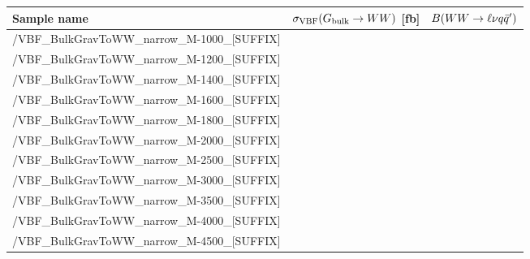 \footnotesize
\begin{tabular}{lrr}
  \hline
  \textbf{Sample name} & $\sigma_{\mathrm{VBF}}(G_\mathrm{bulk}\to WW)$ [fb] & $B(WW\to\ell\nu q\bar{q}')$ \\
  \hline
  \ttfamily/VBF\_BulkGravToWW\_narrow\_M-1000\_[SUFFIX] &   \\
  \ttfamily/VBF\_BulkGravToWW\_narrow\_M-1200\_[SUFFIX] &   \\
  \ttfamily/VBF\_BulkGravToWW\_narrow\_M-1400\_[SUFFIX] &   \\
  \ttfamily/VBF\_BulkGravToWW\_narrow\_M-1600\_[SUFFIX] &   \\
  \ttfamily/VBF\_BulkGravToWW\_narrow\_M-1800\_[SUFFIX] &   \\
  \ttfamily/VBF\_BulkGravToWW\_narrow\_M-2000\_[SUFFIX] &   \\
  \ttfamily/VBF\_BulkGravToWW\_narrow\_M-2500\_[SUFFIX] &   \\
  \ttfamily/VBF\_BulkGravToWW\_narrow\_M-3000\_[SUFFIX] &   \\
  \ttfamily/VBF\_BulkGravToWW\_narrow\_M-3500\_[SUFFIX] &   \\
  \ttfamily/VBF\_BulkGravToWW\_narrow\_M-4000\_[SUFFIX] &   \\
  \ttfamily/VBF\_BulkGravToWW\_narrow\_M-4500\_[SUFFIX] &   \\
  \hline
\end{tabular}
